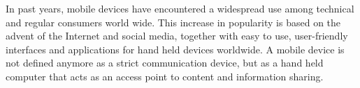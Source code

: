 







In past years, mobile devices have encountered a widespread use among technical and regular consumers world wide. This increase in popularity is based on the advent of the Internet and social media, together with easy to use, user-friendly interfaces and applications for hand held devices worldwide. A mobile device is not defined anymore as a strict communication device, but as a hand held computer that acts as an access point to content and information sharing.


